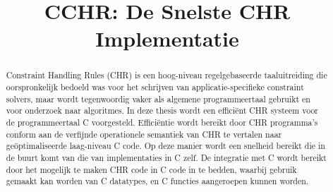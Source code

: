 \documentclass[12pt]{article}
\title{CCHR: De Snelste CHR Implementatie}
\begin{document}
\begin{coverpage} 

% 
% 
% 
% 
%  

\begin{abstract}
Constraint Handling Rules (CHR) is een hoog-niveau regelgebaseerde taaluitreiding die oorspronkelijk bedoeld was voor het schrijven van applicatie-specifieke constraint solvers, maar wordt tegenwoordig vaker als algemene programmeertaal gebruikt en voor onderzoek naar algoritmes. In deze thesis wordt een effici\"ent CHR systeem voor de programmeertaal C voorgesteld. Effici\"entie wordt bereikt door CHR programma's conform aan de verfijnde operationele semantiek van CHR te vertalen naar ge\"optimaliseerde laag-niveau C code. Op deze manier wordt een snelheid bereikt die in de buurt komt van die van implementaties in C zelf. De integratie met C wordt bereikt door het mogelijk te maken CHR code in C code in te bedden, waarbij gebruik gemaakt kan worden van C datatypes, en C functies aangeroepen kunnen worden. 
\end{abstract}

\end{coverpage}		%
\end{document}
